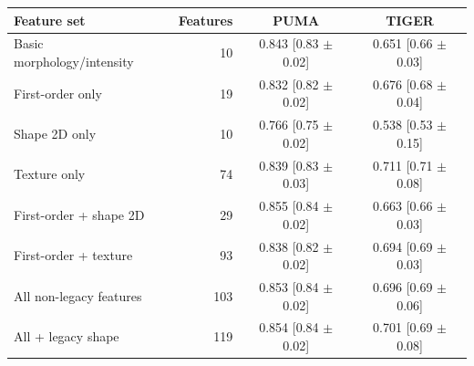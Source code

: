 \begin{tabular}{lrcc}
\toprule
Feature set & Features & PUMA & TIGER \\
\midrule
Basic morphology/intensity & 10 & 0.843 [0.83 $\pm$ 0.02] & 0.651 [0.66 $\pm$ 0.03] \\
First-order only & 19 & 0.832 [0.82 $\pm$ 0.02] & 0.676 [0.68 $\pm$ 0.04] \\
Shape 2D only & 10 & 0.766 [0.75 $\pm$ 0.02] & 0.538 [0.53 $\pm$ 0.15] \\
Texture only & 74 & 0.839 [0.83 $\pm$ 0.03] & 0.711 [0.71 $\pm$ 0.08] \\
First-order + shape 2D & 29 & 0.855 [0.84 $\pm$ 0.02] & 0.663 [0.66 $\pm$ 0.03] \\
First-order + texture & 93 & 0.838 [0.82 $\pm$ 0.02] & 0.694 [0.69 $\pm$ 0.03] \\
All non-legacy features & 103 & 0.853 [0.84 $\pm$ 0.02] & 0.696 [0.69 $\pm$ 0.06] \\
All + legacy shape & 119 & 0.854 [0.84 $\pm$ 0.02] & 0.701 [0.69 $\pm$ 0.08] \\
\bottomrule
\end{tabular}

